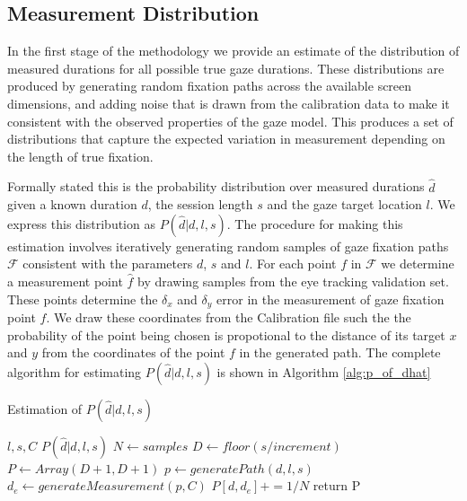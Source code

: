 \documentclass[12pt,a4paper]{article}
\numberwithin{equation}{section}
\begin{document}
\subsection{Measurement Distribution}

In the first stage of the methodology we provide an estimate of the distribution of measured
durations for all possible true gaze durations. These distributions are produced by generating
random fixation paths across the available screen dimensions, and adding noise that is 
drawn from the calibration data to make it consistent with the observed properties of the gaze model.
This produces a set of distributions that capture the expected
variation in measurement depending on the length of true fixation.

Formally stated this is the probability distribution over measured durations $\hat{d}$ given a
known duration $d$, the session length $s$ and the gaze target location $l$. 
We express this distribution as $P(\hat{d}|d,l,s)$. The
procedure for making this estimation involves iteratively generating random samples
of gaze fixation paths $\mathcal{F}$ consistent with the parameters $d$, $s$ and $l$. 
For each point $f$ in $\mathcal{F}$ we determine a measurement point $\hat{f}$ 
by drawing samples from the eye tracking validation set. 
These points determine the $\delta_x$ and $\delta_y$ error in the measurement
of gaze fixation point $f$. We draw these coordinates from the Calibration file such the
the probability of the point being chosen is propotional to the distance of its target
$x$ and $y$ from the coordinates of the point $f$ in the generated path. The complete algorithm
for estimating $P(\hat{d}|d,l,s)$ is shown in Algorithm \ref{alg:p_of_dhat}    

\begin{algorithm}
\caption{Estimation of $P(\hat{d}|d,l,s)$}\label{alg:p_of_dhat}
\begin{algorithmic}
  \Require $l,s,C$
  \Ensure $P(\hat{d}|d,l,s)$
  \State $N \gets samples$              
  \State $D \gets floor(s / increment)$ 
  \State $P \gets Array(D+1,D+1)$       
                    
                    
      \State $p \gets generatePath(d,l,s)$
      \State $d_e \gets generateMeasurement(p,C)$  
      \State $P[d,d_e] += 1/N$          
    \EndFor
  \EndFor
  \State return P
\end{algorithmic}
\end{algorithm}
\end{document}
